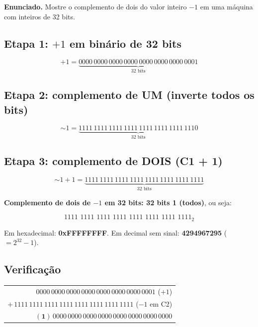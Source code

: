 \documentclass[11pt,a4paper]{article}
\begin{document}
\begin{enunciado}
\textbf{Enunciado.} Mostre o complemento de dois do valor inteiro $-1$ em uma m\'aquina com inteiros de 32 bits.
\end{enunciado}

\subsection*{Etapa 1: $+1$ em bin\'ario de 32 bits}

\[
+1 = \underbrace{0000\,0000\,0000\,0000\,0000\,0000\,0000\,0001}_{32 \text{ bits}}
\]

\subsection*{Etapa 2: complemento de UM (inverte todos os bits)}

\[
\sim 1 = \underbrace{1111\,1111\,1111\,1111\,1111\,1111\,1111\,1110}_{32 \text{ bits}}
\]

\subsection*{Etapa 3: complemento de DOIS (C1 + 1)}

\[
\sim 1 + 1 = \underbrace{1111\,1111\,1111\,1111\,1111\,1111\,1111\,1111}_{32 \text{ bits}}
\]

\begin{resposta}
\textbf{Complemento de dois de $-1$ em 32 bits: 32 bits 1 (todos)}, ou seja:

\[
\text{1111 1111 1111 1111 1111 1111 1111 1111}_2
\]

Em hexadecimal: \textbf{0xFFFFFFFF}. Em decimal sem sinal: \textbf{4294967295} ($= 2^{32} - 1$).
\end{resposta}

\subsection*{Verifica\c{c}\~ao}

\begin{center}
\begin{tabular}{r}
$\phantom{+}0000\,0000\,0000\,0000\,0000\,0000\,0000\,0001$ \quad ($+1$)\\
$+ \, 1111\,1111\,1111\,1111\,1111\,1111\,1111\,1111$ \quad ($-1$ em C2)\\
\hline
$\phantom{+}\mathbf{(1)}\,0000\,0000\,0000\,0000\,0000\,0000\,0000\,0000$
\end{tabular}
\end{center}
\end{document}
